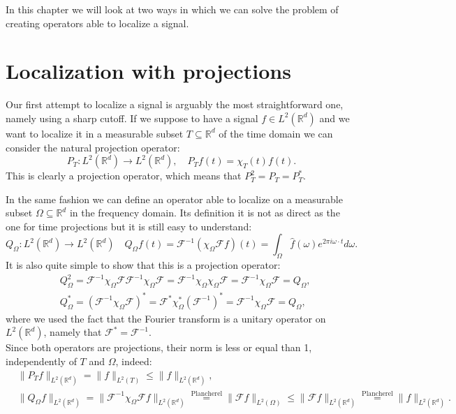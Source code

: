 \documentclass[corpo=11pt, stile=classica, tipotesi=custom,
greek, evenboxes, english]{toptesi}
\numberwithin{equation}{chapter}
\theoremstyle{definition}
\theoremstyle{remark}
\newcommand{\R}{\mathbb{R}} %
\newcommand{\F}{\mathscr{F}} %
\begin{document}
In this chapter we will look at two ways in which we can solve the problem of creating operators able to localize a signal.
\section{Localization with projections}\label{Localization with projections section}
Our first attempt to localize a signal is arguably the most straightforward one, namely using a sharp cutoff. If we suppose to have a signal $f \in L^2(\R^d)$ and we want to localize it in a measurable subset $T \subseteq \R^d$ of the time domain we can consider the natural projection operator:
\begin{equation}\label{time projection operator}
	P_T : L^2(\R^d) \rightarrow L^2(\R^d), \quad P_T f(t) = \chi_T(t) f(t).
\end{equation}
This is clearly a projection operator, which means that $P_T^2 = P_T = P_T^*$.

In the same fashion we can define an operator able to localize on a measurable subset $\Omega \subseteq \R^d$ in the frequency domain. Its definition it is not as direct as the one for time projections but it is still easy to understand:
\begin{equation}\label{frequency projection operator}
	Q_{\Omega} : L^2(\R^d) \rightarrow L^2(\R^d) \quad Q_{\Omega} f(t) = \F^{-1} \left(\chi_{\Omega} \F f \right)(t) = \int_{\Omega} \hat{f}(\omega) e^{2 \pi i \omega \cdot t} d\omega.
\end{equation}
It is also quite simple to show that this is a projection operator:
\begin{align*}
	&Q_{\Omega}^2 = \F^{-1} \chi_{\Omega} \F \F^{-1} \chi_{\Omega} \F = \F^{-1} \chi_{\Omega} \chi_{\Omega} \F = \F^{-1} \chi_{\Omega} \F = Q_{\Omega},\\
	&Q_{\Omega}^* = \left( \F^{-1} \chi_{\Omega} \F\right)^* = \F^* \chi_{\Omega}^* \left(\F^{-1}\right)^* = \F^{-1} \chi_{\Omega} \F = Q_{\Omega},
\end{align*}
where we used the fact that the Fourier transform is a unitary operator on $L^2(\R^d)$, namely that $\F^* = \F^{-1}$.\\
Since both operators are projections, their norm is less or equal than 1, independently of $T$ and $\Omega$, indeed:
\begin{align*}
	&\| P_T f \|_{L^2(\R^d)} = \| f \|_{L^2(T)} \leq \| f \|_{L^2(\R^d)},\\
	&\| Q_{\Omega} f \|_{L^2(\R^d)} = \| \F^{-1} \chi_{\Omega} \F f\|_{L^2(\R^d)} \overset{\text{Plancherel}}{=} \| \F f\|_{L^2(\Omega)} \leq \| \F f \|_{L^2(\R^d)} \overset{\text{Plancherel}}{=} \| f \|_{L^2(\R^d)}.
\end{align*}
\end{document}
